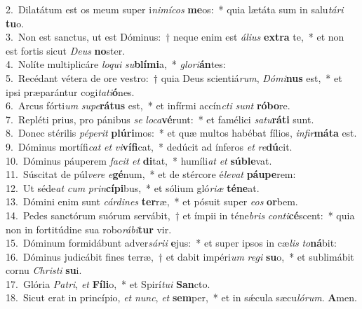 {2.~}Dilatátum est os meum super i\textit{ni}\textit{mí}\textit{cos} \textbf{me}os:~* quia lætáta sum in salu\textit{tá}\textit{ri} \textbf{tu}o.\\
{3.~}Non est sanctus, ut est Dóminus:~† neque enim est \textit{á}\textit{li}\textit{us} \textbf{ex}\textbf{tra} te,~* et non est fortis sicut \textit{De}\textit{us} \textbf{no}ster.\\
{4.~}Nolíte multiplicáre \textit{lo}\textit{qui} \textit{su}\textbf{blí}\textbf{mi}a,~* \textit{glo}\textit{ri}\textbf{án}tes:\\
{5.~}Recédant vétera de ore vestro:~† quia Deus scientiá\textit{rum}, \textit{Dó}\textit{mi}\textbf{nus} est,~* et ipsi præparántur cogi\textit{ta}\textit{ti}\textbf{ó}nes.\\
{6.~}Arcus fórti\textit{um} \textit{su}\textit{pe}\textbf{rá}\textbf{tus} est,~* et infírmi accín\textit{cti} \textit{sunt} \textbf{ró}\textbf{bo}re.\\
{7.~}Repléti prius, pro pánibus \textit{se} \textit{lo}\textit{ca}\textbf{vé}runt:~* et famélici \textit{sa}\textit{tu}\textbf{rá}\textbf{ti} sunt.\\
{8.~}Donec stérilis \textit{pé}\textit{pe}\textit{rit} \textbf{plú}\textbf{ri}mos:~* et quæ multos habébat fílios, \textit{in}\textit{fir}\textbf{má}\textbf{ta} est.\\
{9.~}Dóminus mortífi\textit{cat} \textit{et} \textit{vi}\textbf{ví}\textbf{fi}cat,~* dedúcit ad ínferos \textit{et} \textit{re}\textbf{dú}cit.\\
{10.~}Dóminus páuperem \textit{fa}\textit{cit} \textit{et} \textbf{di}tat,~* humíli\textit{at} \textit{et} \textbf{sú}\textbf{ble}vat.\\
{11.~}Súscitat de púl\textit{ve}\textit{re} \textit{e}\textbf{gé}num,~* et de stércore é\textit{le}\textit{vat} \textbf{páu}\textbf{pe}rem:\\
{12.~}Ut séde\textit{at} \textit{cum} \textit{prin}\textbf{cí}\textbf{pi}bus,~* et sólium gló\textit{ri}\textit{æ} \textbf{té}\textbf{ne}at.\\
{13.~}Dómini enim sunt \textit{cár}\textit{di}\textit{nes} \textbf{ter}ræ,~* et pósuit super \textit{e}\textit{os} \textbf{or}bem.\\
{14.~}Pedes sanctórum suórum servábit,~† et ímpii in téne\textit{bris} \textit{con}\textit{ti}\textbf{cé}scent:~* quia non in fortitúdine sua robo\textit{rá}\textit{bi}\textbf{tur} vir.\\
{15.~}Dóminum formidábunt adver\textit{sá}\textit{ri}\textit{i} \textbf{e}jus:~* et super ipsos in cæ\textit{lis} \textit{to}\textbf{ná}bit:\\
{16.~}Dóminus judicábit fines terræ,~† et dabit impéri\textit{um} \textit{re}\textit{gi} \textbf{su}o,~* et sublimábit cornu \textit{Chri}\textit{sti} \textbf{su}i.\\
{17.~}Glória \textit{Pa}\textit{tri}, \textit{et} \textbf{Fí}\textbf{li}o,~* et Spirí\textit{tu}\textit{i} \textbf{San}cto.\\
{18.~}Sicut erat in princípio, \textit{et} \textit{nunc}, \textit{et} \textbf{sem}per,~* et in sǽcula sæcu\textit{ló}\textit{rum}. \textbf{A}men.\\
